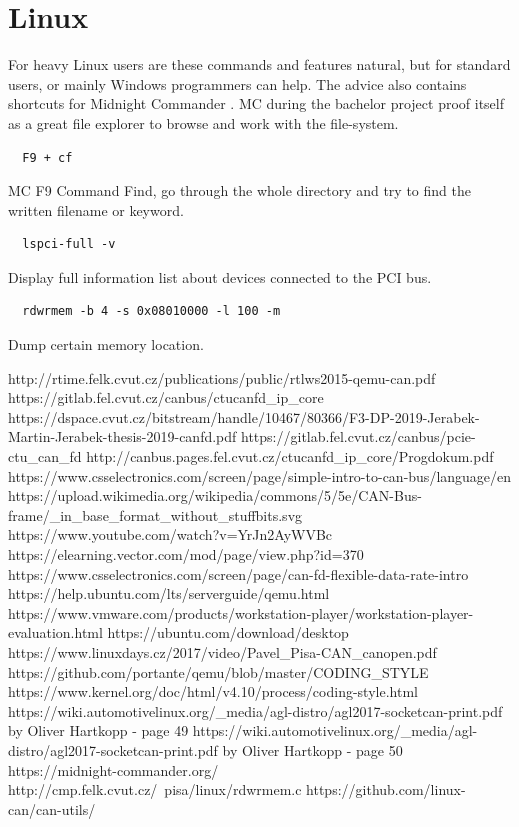 \documentclass{ctuthesis}
\begin{document}
 \section{Linux}
  For heavy Linux users are these commands and features natural, but for standard users, or mainly Windows programmers can help. The advice also contains shortcuts for Midnight Commander \cite{mc}. MC during the bachelor project proof itself as a great file explorer to browse and work with the file-system.
  \begin{verbatim}  F9 + cf\end{verbatim}
  MC F9 Command Find, go through the whole directory and try to find the written filename or keyword.
  \begin{verbatim}  lspci-full -v\end{verbatim}
  Display full information list about devices connected to the PCI bus.
  \begin{verbatim}  rdwrmem -b 4 -s 0x08010000 -l 100 -m\end{verbatim}
  Dump certain memory location. \cite{rdwrmem}
 
 
\renewcommand\bibname{References}
\begin{thebibliography}{1}
 http://rtime.felk.cvut.cz/publications/public/rtlws2015-qemu-can.pdf
 https://gitlab.fel.cvut.cz/canbus/ctucanfd\_ip\_core
 https://dspace.cvut.cz/bitstream/handle/10467/80366/F3-DP-2019-Jerabek-Martin-Jerabek-thesis-2019-canfd.pdf
 https://gitlab.fel.cvut.cz/canbus/pcie-ctu\_can\_fd
 http://canbus.pages.fel.cvut.cz/ctucanfd\_ip\_core/Progdokum.pdf
 https://www.csselectronics.com/screen/page/simple-intro-to-can-bus/language/en
 https://upload.wikimedia.org/wikipedia/commons/5/5e/CAN-Bus-frame/\_in\_base\_format\_without\_stuffbits.svg
 https://www.youtube.com/watch?v=YrJn2AyWVBc
 https://elearning.vector.com/mod/page/view.php?id=370
 https://www.csselectronics.com/screen/page/can-fd-flexible-data-rate-intro
 https://help.ubuntu.com/lts/serverguide/qemu.html
 https://www.vmware.com/products/workstation-player/workstation-player-evaluation.html
 https://ubuntu.com/download/desktop
 https://www.linuxdays.cz/2017/video/Pavel\_Pisa-CAN\_canopen.pdf
 https://github.com/portante/qemu/blob/master/CODING\_STYLE
 https://www.kernel.org/doc/html/v4.10/process/coding-style.html
 https://wiki.automotivelinux.org/\_media/agl-distro/agl2017-socketcan-print.pdf by Oliver Hartkopp - page 49
 https://wiki.automotivelinux.org/\_media/agl-distro/agl2017-socketcan-print.pdf by Oliver Hartkopp - page 50
 https://midnight-commander.org/
 http://cmp.felk.cvut.cz/~pisa/linux/rdwrmem.c
 https://github.com/linux-can/can-utils/
\end{thebibliography}
\end{document}
